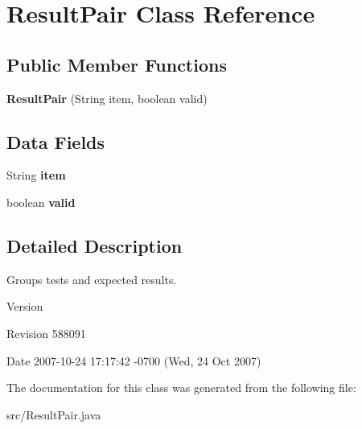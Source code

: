 \hypertarget{classResultPair}{}\section{Result\+Pair Class Reference}
\label{classResultPair}
\subsection*{Public Member Functions}
\begin{DoxyCompactItemize}
\item 
{\bfseries Result\+Pair} (String item, boolean valid)\hypertarget{classResultPair_a68f95e8177e171c52276175c9cfd4496}{}\label{classResultPair_a68f95e8177e171c52276175c9cfd4496}

\end{DoxyCompactItemize}
\subsection*{Data Fields}
\begin{DoxyCompactItemize}
\item 
String {\bfseries item}\hypertarget{classResultPair_a57f116b1233276d56ac8a725e9b8ee74}{}\label{classResultPair_a57f116b1233276d56ac8a725e9b8ee74}

\item 
boolean {\bfseries valid}\hypertarget{classResultPair_a219ec2c717341670988da0bce0b34fae}{}\label{classResultPair_a219ec2c717341670988da0bce0b34fae}

\end{DoxyCompactItemize}


\subsection{Detailed Description}
Groups tests and expected results.

\begin{DoxyVersion}{Version}

\end{DoxyVersion}
\begin{DoxyParagraph}{Revision}
588091 
\end{DoxyParagraph}
\begin{DoxyParagraph}{Date}
2007-\/10-\/24 17\+:17\+:42 -\/0700 (Wed, 24 Oct 2007) 
\end{DoxyParagraph}


The documentation for this class was generated from the following file\+:\begin{DoxyCompactItemize}
\item 
src/Result\+Pair.\+java\end{DoxyCompactItemize}
